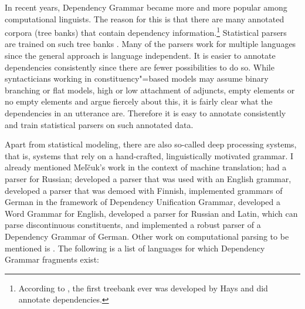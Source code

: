


In recent years, Dependency Grammar became more and more popular among computational linguists. The
reason for this is that there are many annotated corpora (tree banks) that contain dependency
information.\footnote{
  According to \citet{Kay2000a-u}, the first treebank ever was developed by Hays and did
  annotate dependencies.
} Statistical parsers are trained on such tree banks \citep{YM2003a-u,Attardi2006a-u,Nivre2003a-u,KMcDN2009a-u,Bohnet2010a-u}. Many of
the parsers work for multiple languages since the general approach is language independent. It is
easier to annotate dependencies consistently since there are fewer possibilities to do
so.
While
syntacticians working in constituency"=based models may assume binary branching or flat models, high
or low attachment of adjuncts, empty elements or no empty elements and argue fiercely about this,
it is fairly clear what the dependencies in an utterance are. Therefore it is easy to annotate
consistently and train statistical parsers on such annotated data.


Apart from statistical modeling, there are also so-called deep processing systems, that is, systems
that rely on a hand-crafted, linguistically motivated grammar. I already mentioned Meľčuk's work in
the context of machine translation; \citet{HZ60a-u} had a parser for Russian;
\citet{SN86a} developed a parser that was used with an English
grammar, \citet*{JLV86a-u} developed a parser that was demoed with Finnish, \citet{Hellwig86a-u,Hellwig2003a,Hellwig2006a}
implemented grammars of German in the framework of Dependency Unification Grammar, \citet{Hudson89a}
developed a Word Grammar for English,
\citet{Covington90a} developed a parser for Russian and Latin, which can parse discontinuous constituents, and
\citet{Menzel98a-u} implemented a robust parser of a Dependency Grammar of German.
Other work on computational parsing to be mentioned is
.
The following is a list of languages for which Dependency Grammar
fragments exist:

